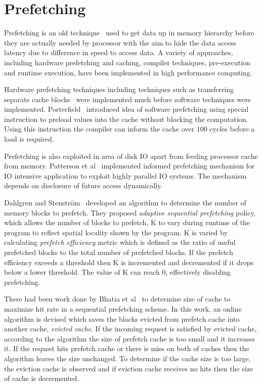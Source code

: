 \section{Prefetching}
Prefetching is an old technique~\cite{anacker68}\cite{Smith1982}\cite{Vanderwiel2000}
used to get data up in memory hierarchy before they are actually needed by processor
with the aim to hide the data access latency due to difference in speed to access
data. A variety of approaches, including hardware prefetching and caching, compiler
techniques, pre-execution and runtime execution, have been implemented in high
performance computing.

Hardware prefetching techniques including techniques such as transferring separate
cache blocks~\cite{Smith1978} were implemented much before software techniques were
implemented. Porterfield~\cite{Porterfield1989} introduced idea of software prefetching
using special instruction to preload values into the cache without blocking the
computation. Using this instruction the compiler can inform the cache over 100
cycles before a load is required.

Prefetching is also exploited in area of disk IO apart from feeding processor cache
from memory. Patterson et al~\cite{Patterson1994} implemented informed prefetching
mechanism for IO intensive application to exploit highly parallel IO systems. The
mechanism depends on disclosure of future access dynamically.

Dahlgren and Stenström~\cite{Dahlgren1993} developed an algorithm to determine the
number of memory blocks to prefetch. They proposed
\textit{adaptive sequential prefetching} policy, which allows the number of blocks
to prefetch, K to vary during runtime of the program to reflect spatial locality
shown by the program. K is varied by calculating \textit{prefetch efficiency} metric
which is defined as the ratio of useful prefetched blocks to the total number of
prefetched blocks. If the prefetch efficiency exceeds a threshold then K is
incremented and decremented if it drops below a lower threshold. The value of K
can reach 0, effectively disabling prefetching.

There had been work done by Bhatia et al~\cite{Bhatia2010} to determine size of
cache to maximize hit rate in a sequential prefetching scheme. In this work, an
online algorithm is devised which saves the blocks evicted from prefetch cache
into another cache, \textit{evicted cache}. If the incoming request is satisfied
by evicted cache, according to the algorithm the size of prefetch cache is too
small and it increases it. If the request hits prefetch cache or there is miss
on both of caches then the algorithm leaves the size unchanged. To determine if
the cache size is too large, the eviction cache is observed and if eviction cache
receives no hits then the size of cache is decremented.
